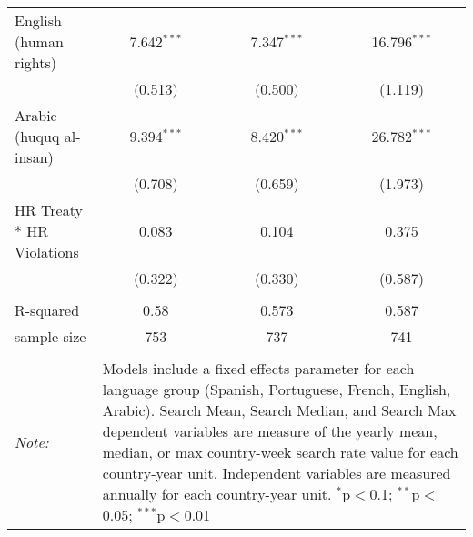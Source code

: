 \begin{table}[!htbp]
\begin{tabular}{@{\extracolsep{5pt}}lccc}
  English (human rights) & 7.642$^{***}$ & 7.347$^{***}$ & 16.796$^{***}$ \\ 
  & (0.513) & (0.500) & (1.119) \\ 
  Arabic (huquq al-insan) & 9.394$^{***}$ & 8.420$^{***}$ & 26.782$^{***}$ \\ 
  & (0.708) & (0.659) & (1.973) \\ 
  HR Treaty * HR Violations & 0.083 & 0.104 & 0.375 \\ 
  & (0.322) & (0.330) & (0.587) \\ 
 \hline \\[-1.8ex] 
R-squared  & 0.58 & 0.573 & 0.587 \\ 
sample size  & 753 & 737 & 741 \\ 
\hline 
\hline \\[-1.8ex] 
\textit{Note:}  & \multicolumn{3}{l}{\parbox[t]{8cm}{Models include a fixed effects parameter for each language group (Spanish, Portuguese, French, English, Arabic). Search Mean, Search Median, and Search Max dependent variables are measure of the yearly mean, median, or max country-week search rate value for each country-year unit. Independent variables are measured annually for each country-year unit. $^{*}$p$<$0.1; $^{**}$p$<$0.05; $^{***}$p$<$0.01}} \\ 
\end{tabular} 
\end{table} 
